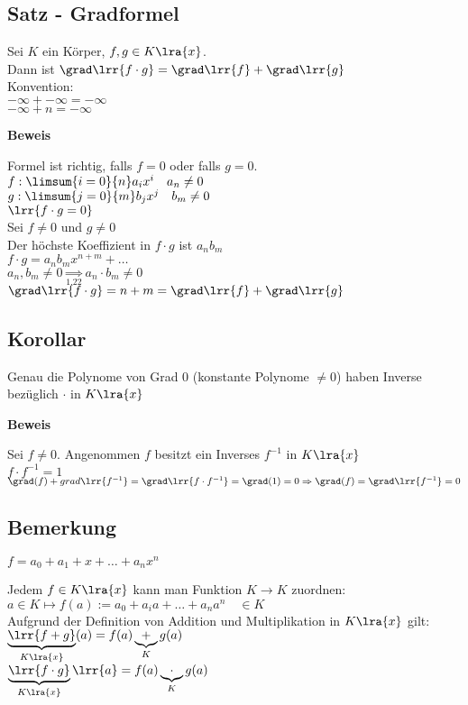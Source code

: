 \subsection{Satz - Gradformel}
	Sei $K$ ein Körper, $f,g\in K\lra{x}$.\\
	Dann ist $\grad\lrr{f\cdot g}=\grad\lrr{f}+\grad\lrr{g}$\\
	Konvention:\\
	$-\infty+-\infty=-\infty$\\
	$-\infty+n=-\infty$

	\textbf{Beweis}

	Formel ist richtig, falls $f=0$ oder falls $g=0$.\\
	$f:\limsum{i=0}{n}a_ix^i\quad a_n\neq 0$\\
	$g:\limsum{j=0}{m}b_jx^j\quad b_m\neq 0$\\
	$\lrr{f\cdot g = 0}$\\
	Sei $f\neq 0$ und $g\neq 0$\\
	Der höchste Koeffizient in $f\cdot g$ ist $a_nb_m$\\
	$f\cdot g=a_nb_mx^{n+m}+\dots$\\
	$a_n,b_m\neq 0\underset{1.22}{\Rightarrow}a_n\cdot b_m\neq 0$\\
	$\grad\lrr{f\cdot g}=n+m=\grad\lrr{f}+\grad\lrr{g}$
\subsection{Korollar}
	Genau die Polynome von Grad $0$ (konstante Polynome $\neq 0$) haben Inverse bezüglich $\cdot$ in $K\lra{x}$

	\textbf{Beweis}

	Sei $f\neq 0$. Angenommen $f$ besitzt ein Inverses $f^{-1}$ in $K\lra{x}$\\
	$f\cdot f^{-1} =1$\\
	$\grad(f)+grad\lrr{f^{-1}}=\grad\lrr{f\cdot f^{-1}}=\grad(1)=0\Rightarrow\grad(f)=\grad\lrr{f^{-1}}= 0$
\subsection{Bemerkung}
	$f=a_0+a_1+x+\dots+a_nx^n$
		\item Jedem $f\in K\lra{x}$ kann man Funktion $K\rightarrow K$ zuordnen:\\
			$a\in K\mapsto f(a):=a_0+a_ia+\dots+a_na^n\quad \in K$\\
			Aufgrund der Definition von Addition und Multiplikation in $K\lra{x}$ gilt:\\
			$\underbrace{\lrr{f+g}}_{K\lra{x}}(a)=f(a)\underbrace{+}_{K}g(a)$\\
			$\underbrace{\lrr{f\cdot g}}_{K\lra{x}}\lrr{a}=f(a)\underbrace{\cdot}_K g(a)$

